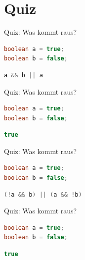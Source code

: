 \documentclass[18pt]{beamer}
\begin{document}
\section{Quiz}

\begin{frame}[fragile]{Quiz: Was kommt raus?}
    \begin{lstlisting}[language=Java]
boolean a = true;
boolean b = false;
    \end{lstlisting}
    \begin{exampleblock}{}
        \begin{lstlisting}[language=Java]
a && b || a
        \end{lstlisting}
    \end{exampleblock}
\end{frame}

\begin{frame}[fragile]{Quiz: Was kommt raus?}
    \begin{lstlisting}[language=Java]
boolean a = true;
boolean b = false;
    \end{lstlisting}
    \begin{block}{}
        \begin{lstlisting}[language=Java]
true
        \end{lstlisting}
    \end{block}
\end{frame}

\begin{frame}[fragile]{Quiz: Was kommt raus?}
    \begin{lstlisting}[language=Java]
boolean a = true;
boolean b = false;
    \end{lstlisting}
    \begin{exampleblock}{}
        \begin{lstlisting}[language=Java]
(!a && b) || (a && !b)
        \end{lstlisting}
    \end{exampleblock}
\end{frame}

\begin{frame}[fragile]{Quiz: Was kommt raus?}
    \begin{lstlisting}[language=Java]
boolean a = true;
boolean b = false;
    \end{lstlisting}
    \begin{block}{}
        \begin{lstlisting}[language=Java]
true
        \end{lstlisting}
    \end{block}
\end{frame}
\end{document}
